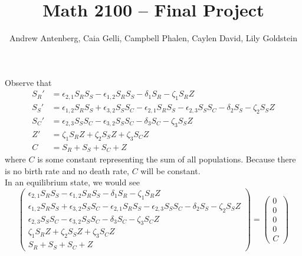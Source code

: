 \documentclass[12pt,a4paper]{exam}
\title{Math 2100 -- Final Project}
\author{Andrew Antenberg, Caia Gelli, Campbell Phalen, Caylen David, Lily Goldstein}
\begin{document}
\maketitle

Observe that
\begin{align*}
    S_R' &= \epsilon_{2,1} S_R S_S - \epsilon_{1,2} S_R S_S - \delta_1 S_R - \zeta_1 S_R Z \\
    S_S' &= \epsilon_{1,2} S_R S_S + \epsilon_{3,2} S_S S_C - \epsilon_{2,1} S_R S_S - \epsilon_{2,3} S_S S_C - \delta_2 S_S - \zeta_2 S_S Z \\
    S_C' &= \epsilon_{2,3} S_S S_C - \epsilon_{3,2} S_S S_C - \delta_3 S_C - \zeta_3 S_S Z \\
    Z'   &= \zeta_1 S_R Z + \zeta_2 S_S Z + \zeta_3 S_C Z \\
    C    &= S_R + S_S + S_C + Z
\end{align*}
where $C$ is some constant representing the sum of all populations. Because there is no birth rate and no death rate, $C$ will be constant. \\

In an equilibrium state, we would see
\[
    \begin{pmatrix}
    \epsilon_{2,1} S_R S_S - \epsilon_{1,2} S_R S_S - \delta_1 S_R - \zeta_1 S_R Z \\
    \epsilon_{1,2} S_R S_S + \epsilon_{3,2} S_S S_C - \epsilon_{2,1} S_R S_S - \epsilon_{2,3} S_S S_C - \delta_2 S_S - \zeta_2 S_S Z \\
    \epsilon_{2,3} S_S S_C - \epsilon_{3,2} S_S S_C - \delta_3 S_C - \zeta_3 S_C Z \\
    \zeta_1 S_R Z + \zeta_2 S_S Z + \zeta_3 S_C Z \\
    S_R + S_S + S_C + Z
    \end{pmatrix}
    =
    \begin{pmatrix}
        0 \\
        0 \\
        0 \\
        0 \\
        C
    \end{pmatrix}
\]
\end{document}
